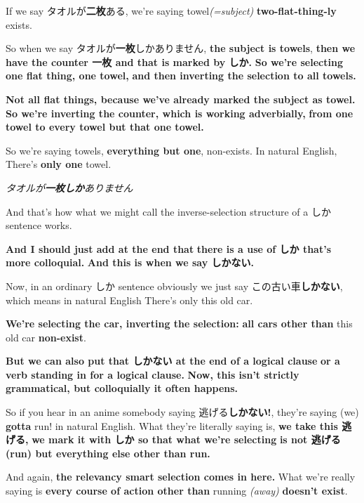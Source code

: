 If we say タオルが{\bf 二枚}ある, we're saying towel{\em (=subject)} {\bf two-flat-thing-ly} exists.

So when we say タオルが{\bf 一枚}しかありません, {\bf the subject is towels}, {\bf then we have the counter 一枚 and that is marked by しか.} {\bf So we're selecting one flat thing, one towel,} {\bf and then inverting the selection to all towels.}

\thinrule

{\bf Not all flat things, because we've already marked the subject as towel.} {\bf So we're inverting the counter, which is working adverbially,} {\bf from one towel to every towel but that one towel.}

So we're saying towels, {\bf everything but one}, non-exists. In natural English, There's {\bf only one} towel.

{\em タオルが{\bf 一枚しか}ありません}

And that's how what we might call the inverse-selection structure of a しか sentence works.

\stopsectionlevel

\startsectionlevel[title={しかない (Colloquial)},reference={しかない-colloquial}]

{\bf And I should just add at the end that} {\bf there is a use of しか that's more colloquial.} {\bf And this is when we say しかない.}

{}

Now, in an ordinary しか sentence obviously we just say この古い車{\bf しかない}, which means in natural English There's only this old car.

{\bf We're selecting the car, inverting the selection:} {\bf all cars other than} this old car {\bf non-exist}.

\thinrule

{\bf But we can also put that しかない at the end of a logical clause} {\bf or a verb standing in for a logical clause.} {\bf Now, this isn't strictly grammatical, but colloquially it often happens.}

So if you hear in an anime somebody saying 逃げる{\bf しかない!}, they're saying (we) {\bf gotta} run! in natural English. What they're literally saying is, {\bf we take this 逃げる,} {\bf we mark it with しか so that what we're selecting} {\bf is not 逃げる (run) but everything else other than run.}

And again, {\bf the relevancy smart selection comes in here.} What we're really saying is {\bf every course of action other than} running {\em (away)} {\bf doesn't exist}.

